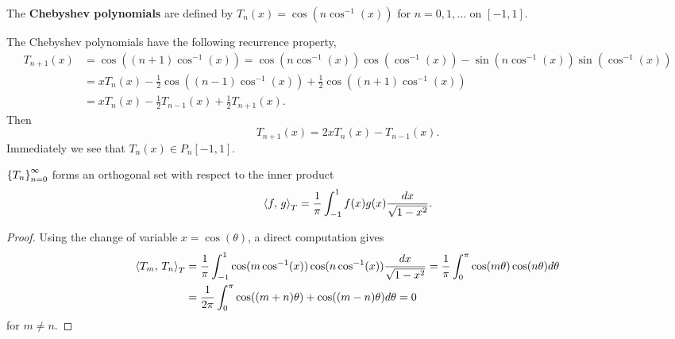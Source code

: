 \begin{definition}
    The \textbf{Chebyshev polynomials} are defined by $T_n(x) = \cos(n\cos^{-1}(x))$ 
    for $n = 0,1,\ldots$ on $[-1,1]$.
\end{definition}
\begin{remark}
    The Chebyshev polynomials have the following recurrence property, 
    \begin{equation*}
        \begin{split}
            T_{n+1}(x) &= \cos((n+1)\cos^{-1}(x)) = \cos(n\cos^{-1}(x))\cos(\cos^{-1}(x)) - \sin(n\cos^{-1}(x))\sin(\cos^{-1}(x)) \\
            &= xT_n(x) - \frac{1}{2}\cos((n-1)\cos^{-1}(x)) + \frac{1}{2}\cos((n+1)\cos^{-1}(x)) \\
            &= xT_n(x) - \frac{1}{2}T_{n-1}(x) + \frac{1}{2}T_{n+1}(x).
        \end{split}
    \end{equation*}
    Then 
    \begin{equation*}
        T_{n+1}(x) = 2xT_n(x) - T_{n-1}(x).
    \end{equation*}
    Immediately we see that $T_n(x)\in P_n[-1,1]$.
\end{remark}

\begin{proposition}
    $\left\{ {T_n} \right\}_{n=0}^\infty$ forms an orthogonal set with respect to 
    the inner product 
    \begin{equation*}
        \left\langle {f},\, {g} \right\rangle_T = \frac{1}{\pi}\int_{-1}^{1} f(x)g(x)\frac{dx}{\sqrt{1-x^2}}.
    \end{equation*}
\end{proposition}
\begin{proof}
    Using the change of variable $x = \cos(\theta)$, a direct 
    computation gives 
    \begin{equation*}
        \begin{split}
            \left\langle {T_m},\, {T_n} \right\rangle_T &= \frac{1}{\pi}\int_{-1}^{1} \cos(m\cos^{-1}(x))\cos(n\cos^{-1}(x))\frac{dx}{\sqrt{1-x^2}} 
            = \frac{1}{\pi}\int_0^\pi \cos(m\theta)\cos(n\theta)d\theta \\
            &= \frac{1}{2\pi}\int_0^\pi \cos((m+n)\theta) + \cos((m-n)\theta)d\theta 
            = 0
        \end{split}
    \end{equation*}
    for $m\neq n$.
\end{proof}

